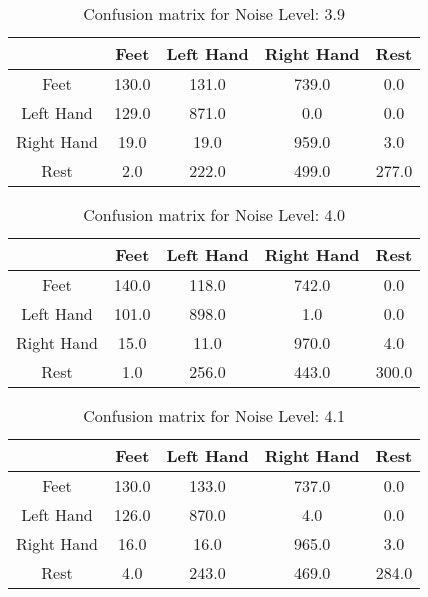 \begin{table}[!htbp]
    \centering
    \begin{tabular}{|c||c|c|c|c|}
        \hline
		 & Feet & Left Hand & Right Hand & Rest \\
        \hline
        \hline
        Feet & 130.0 & 131.0 & 739.0 & 0.0 \\
        \hline
        Left Hand & 129.0 & 871.0 & 0.0 & 0.0 \\
        \hline
        Right Hand & 19.0 & 19.0 & 959.0 & 3.0 \\
        \hline
        Rest & 2.0 & 222.0 & 499.0 & 277.0 \\
        \hline
    \end{tabular}
    \caption{Confusion matrix for Noise Level: 3.9}
\end{table}

\begin{table}[!htbp]
    \centering
    \begin{tabular}{|c||c|c|c|c|}
        \hline
		 & Feet & Left Hand & Right Hand & Rest \\
        \hline
        \hline
        Feet & 140.0 & 118.0 & 742.0 & 0.0 \\
        \hline
        Left Hand & 101.0 & 898.0 & 1.0 & 0.0 \\
        \hline
        Right Hand & 15.0 & 11.0 & 970.0 & 4.0 \\
        \hline
        Rest & 1.0 & 256.0 & 443.0 & 300.0 \\
        \hline
    \end{tabular}
    \caption{Confusion matrix for Noise Level: 4.0}
\end{table}

\begin{table}[!htbp]
    \centering
    \begin{tabular}{|c||c|c|c|c|}
        \hline
		 & Feet & Left Hand & Right Hand & Rest \\
        \hline
        \hline
        Feet & 130.0 & 133.0 & 737.0 & 0.0 \\
        \hline
        Left Hand & 126.0 & 870.0 & 4.0 & 0.0 \\
        \hline
        Right Hand & 16.0 & 16.0 & 965.0 & 3.0 \\
        \hline
        Rest & 4.0 & 243.0 & 469.0 & 284.0 \\
        \hline
    \end{tabular}
    \caption{Confusion matrix for Noise Level: 4.1}
\end{table}


